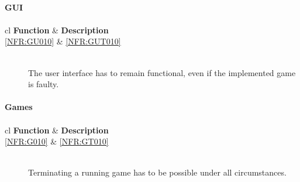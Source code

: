 
\paragraph{GUI}
\paragraph*{}
\begin{tabular}{{c}{l}}
    \hline
    \textbf{Function} & \textbf{Description} \\ \hline
	\ref{NFR:GU010} & \ref{NFR:GUT010} \\ \hline
\end{tabular}

\vspace{.5cm}

\begin{description}
  	\item[] \textbf{}  \\
	The user interface has to remain functional, even if the implemented game is faulty.
\end{description}


\paragraph{Games}
\paragraph*{}
\begin{tabular}{{c}{l}}
    \hline
    \textbf{Function} & \textbf{Description} \\ \hline
	\ref{NFR:G010} & \ref{NFR:GT010} \\ \hline
\end{tabular}

\vspace{.5cm}

\begin{description}
	\item[] \textbf{}  \\
	Terminating a running game has to be possible under all circumstances. 
\end{description}



